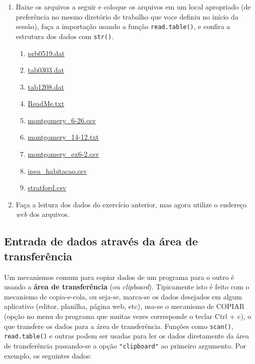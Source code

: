 \documentclass[
  10pt,
  a4paper]{book}
\providecommand{\tightlist}{%
  \setlength{\itemsep}{0pt}\setlength{\parskip}{0pt}}
\begin{document}
\begin{enumerate}
\def\labelenumi{\arabic{enumi}.}
\tightlist
\item
  Baixe os arquivos a seguir e coloque os arquivos em um local apropriado
  (de preferência no mesmo diretório de trabalho que voce definiu no
  início da sessão), faça a importação usando a função \texttt{read.table()}, e
  confira a estrutura dos dados com \texttt{str()}.

  \begin{enumerate}
  \def\labelenumii{\alph{enumii}.}
  \tightlist
  \item
    \href{http://leg.ufpr.br/~fernandomayer/data/BHH2/prb0519.dat}{prb0519.dat}
  \item
    \href{http://leg.ufpr.br/~fernandomayer/data/BHH2/tab0303.dat}{tab0303.dat}
  \item
    \href{http://leg.ufpr.br/~fernandomayer/data/BHH2/tab1208.dat}{tab1208.dat}
  \item
    \href{http://leg.ufpr.br/~fernandomayer/data/BHH2/ReadMe.txt}{ReadMe.txt}
  \item
    \href{http://leg.ufpr.br/~fernandomayer/data/montgomery_6-26.csv}{montgomery\_6-26.csv}
  \item
    \href{http://leg.ufpr.br/~fernandomayer/data/montgomery_14-12.txt}{montgomery\_14-12.txt}
  \item
    \href{http://leg.ufpr.br/~fernandomayer/data/montgomery_ex6-2.csv}{montgomery\_ex6-2.csv}
  \item
    \href{http://www.leg.ufpr.br/~fernandomayer/data/ipea_habitacao.csv}{ipea\_habitacao.csv}
  \item
    \href{http://www.leg.ufpr.br/~fernandomayer/data/stratford.csv}{stratford.csv}
  \end{enumerate}
\item
  Faça a leitura dos dados do exercício anterior, mas agora utilize o
  endereço \emph{web} dos arquivos.
\end{enumerate}

\hypertarget{entrada-de-dados-atravuxe9s-da-uxe1rea-de-transferuxeancia}{%
\subsection{Entrada de dados através da área de transferência}\label{entrada-de-dados-atravuxe9s-da-uxe1rea-de-transferuxeancia}}

Um mecanismos comum para copiar dados de um programa para o outro é
usando a \textbf{área de transferência} (ou \emph{clipboard}). Tipicamente isto é
feito com o mecanismo de copia-e-cola, ou seja-se, marca-se os dados
desejados em algum aplicativo (editor, planilha, página web, etc),
usa-se o mecanismo de COPIAR (opção no menu do programa que muitas vezes
corresponde o teclar Ctrl + c), o que transfere
os dados para a área de transferência. Funções como \texttt{scan()},
\texttt{read.table()} e outras podem ser usadas para ler os dados diretamente
da área de transferência passando-se a opção \texttt{"clipboard"} ao
primeiro argumento. Por exemplo, os seguintes dados:
\end{document}
